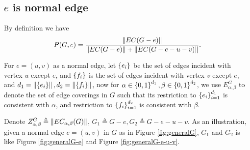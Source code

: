 \subsection{$e$ is normal edge}
By definition we have
\begin{equation}
	P(G,e) = \frac{\left\Vert EC(G-e)\right\Vert}{\left\Vert EC(G-e)\right\Vert + \left\Vert EC(G-e-u-v)\right\Vert }.
\end{equation}


	For $e=(u,v)$ as a normal edge, let $\left\{e_i\right\}$ be the set of edges incident with vertex $u$ except $e$, and $\left\{f_i\right\}$ is the set of edges incident with vertex $v$ except $e$, and $d_1 = \left\Vert\left\{e_i\right\}\right\Vert, d_2 = \left\Vert\left\{f_i\right\}\right\Vert$, now for $\alpha \in \left\{0,1\right\}^{d_1}, \beta \in \left\{0,1\right\}^{d_2}$, we use $E_{\alpha,\beta}^G$ to denote the set of edge coverings in $G$ such that its restriction to $\left\{e_i\right\}_{i=1}^{d_1}$ is consistent with $\alpha$, and restriction to $\left\{f_i\right\}_{i=1}^{d_2}$ is consistent with $\beta$.

	Denote $Z_{\alpha, \beta}^G \triangleq \left\Vert EC_{\alpha, \beta}(G)\right\Vert$, $G_1 \triangleq G-e, G_2 \triangleq G-e-u-v$. As an illustration, given a normal edge $e=(u,v)$ in $G$ as in Figure \ref{fig:generalG}, $G_1$ and $G_2$ is like Figure \ref{fig:generalG-e} and Figure \ref{fig:generalG-e-u-v}.

